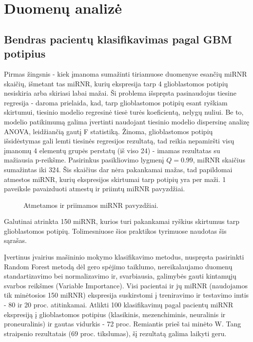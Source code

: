\documentclass[a4paper,12pt]{article}
\begin{document}
\section{Duomenų analizė}
\subsection{Bendras pacientų klasifikavimas pagal GBM potipius}
\indent\indent
Pirmas žingsnis - kiek įmanoma sumažinti tiriamuose duomenyse esančių miRNR skaičių, išmetant tas miRNR, kurių ekspresija tarp 4 glioblastomos potipių nesiskiria arba skiriasi labai mažai. Ši problema išspręsta pasinaudojus tiesine regresija - daroma prielaida, kad, tarp glioblastomos potipių esant ryškiam skirtumui, tiesinio modelio regresinė tiesė turės koeficientą, nelygų nuliui. Be to, modelio patikimumą galima įvertinti naudojant tiesinio modelio dispersinę analizę ANOVA, leidžiančią gautį F statistiką. Žinoma, glioblastomos potipių išsidėstymas gali lemti tiesinės regresijos rezultatą, tad reikia nepamiršti visų įmanomų 4 elementų grupės perstatų (iš viso 24) - imamas rezultatas su mažiausia p-reikšme. Pasirinkus pasikliovimo lygmenį $Q = 0.99$, miRNR skaičius sumažintas iki 324. Šis skaičius dar nėra pakankamai mažas, tad papildomai atmestos miRNR, kurių ekspresijos skirtumai tarp potipių yra per maži. 1 paveiksle pavaizduoti atmestų ir priimtų miRNR pavyzdžiai.

\begin{figure}[H]
\centering
{}
\centering
{}
\caption{Atmetamos ir priimamos miRNR pavyzdžiai.}
\end{figure}

Galutinai atrinkta 150 miRNR, kurios turi pakankamai ryškius skirtumus tarp glioblastomos potipių. Tolimesniuose šios praktikos tyrimuose naudotas šis sąrašas.

Įvertinus įvairius mašininio mokymo klasifikavimo metodus, nuspręsta pasirinkti Random Forest metodą dėl gero spėjimo taiklumo, nereikalaujamo duomenų standartizavimo bei normalizavimo ir, svarbiausia, galimybės gauti kintamųjų svarbos reikšmes (Variable Importance)\cite{randomforest}. Visi pacientai ir jų miRNR (naudojamos tik minėtosios 150 miRNR) ekspresija suskirstomi į treniravimo ir testavimo imtis - 80 ir 20 proc. atitinkamai. Atlikti 100 klasifikavimų pagal pacientų miRNR ekspresiją į glioblastomos potipius (klasikinis, mezenchiminis, neuralinis ir proneuralinis) ir gautas vidurkis - 72 proc. Remiantis prieš tai minėto W. Tang straipsnio\cite{tang} rezultatais (69 proc. tikslumas), šį rezultatą galima laikyti geru.
\end{document}
